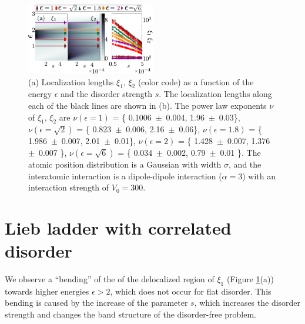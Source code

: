 \documentclass[prl,aps,twocolumn,showpacs,superscriptaddress,longbibliography]{revtex4-1}
\begin{document}
\begin{figure}

	      \includegraphics[width=0.5\textwidth]{graphics/loc_length_dipole_BW.pdf}

    \caption{(a) Localization lengths $\xi_1,\,\xi_2$ (color code)  as a function of the energy $\epsilon$ and the disorder strength $s$.
              The localization lengths along each of the black lines are shown in (b).
              The power law exponents $\nu$ of $\xi_1,\,\xi_2$ are
                $\nu\left(\epsilon = 1\right)$ = \{ 0.1006~$\pm$~0.004, 1.96~$\pm$~0.03\}, 
 	        $\nu\left(\epsilon = \sqrt{2}\right)$ = \{ 0.823~$\pm$~0.006, 2.16~$\pm$~0.06\},
 		$\nu\left(\epsilon = 1.8\right)$ = \{ 1.986~$\pm$~0.007, 2.01~$\pm$~0.01\},   
  		$\nu\left(\epsilon = 2\right)$ = \{ 1.428~$\pm$~0.007, 1.376~$\pm$~0.007 \},
 		$\nu\left(\epsilon = \sqrt{6}\right)$ = \{ 0.034~$\pm$~0.002, 0.79~$\pm$~0.01 \}.
	 The atomic position distribution is a Gaussian with width $\sigma$, and the interatomic interaction is a dipole-dipole interaction ($\alpha = 3$) with an interaction strength of $V_0 = 300$.
	     } 
   \label{Fig:2D_loc_length}
\end{figure}  




%
\section{Lieb ladder with correlated disorder}


We observe a ``bending'' of the of the delocalized region of $\xi_1$ (Figure \ref{Fig:2D_loc_length}(a)) towards higher energies $\epsilon>2$, which does not occur for flat disorder.
This bending is caused by the increase of the parameter $s$, which increases the disorder strength and changes the band structure of the disorder-free problem.
\end{document}
